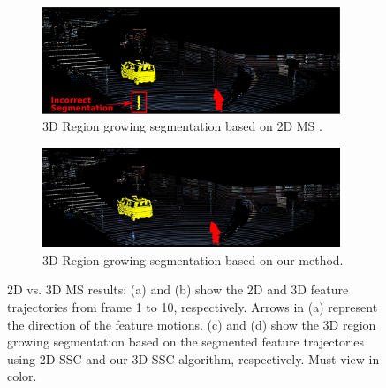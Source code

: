 \documentclass[10pt,twocolumn,letterpaper]{article}  %
\begin{document}
\begin{figure}
  \centering
	\begin{subfigure}{0.5\textwidth}
  	\centering
 	\includegraphics[height=0.108\textheight, width=0.98\textwidth]{image/MS2D_RG.eps}
  	\caption{ 3D Region growing segmentation based on 2D MS \cite{c2}.}
  	\label{fig:2dRG}
	\end{subfigure}%
	\begin{subfigure}{0.5\textwidth}
 	\centering
  	\includegraphics[height=0.108\textheight, width=0.98\textwidth]{image/MS3D_RG.eps}%
  	\caption{3D Region growing segmentation based on our method.}
  	\label{fig:3dRG} 
  	\end{subfigure}%
\caption{2D vs. 3D MS results: (a) and (b) show the 2D and 3D feature trajectories from frame 1 to 10, respectively. Arrows in (a) represent the direction of the feature motions. (c) and (d) show the 3D region growing segmentation based on the segmented feature trajectories using 2D-SSC and our 3D-SSC algorithm, respectively. Must view in color.}
\label{fig:MSRG}
\vspace{-3mm}
\end{figure}
\end{document}
